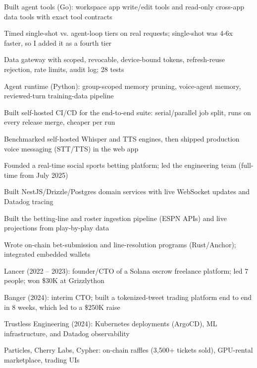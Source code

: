 \documentclass[print]{jack-resume}
\begin{document}
\begin{tightemize}
    \item Built agent tools (Go): workspace app write/edit tools and read-only cross-app data tools with exact tool contracts
    \item Timed single-shot vs. agent-loop tiers on real requests; single-shot was 4-6x faster, so I added it as a fourth tier
    \item Data gateway with scoped, revocable, device-bound tokens, refresh-reuse rejection, rate limits, audit log; 28 tests
    \item Agent runtime (Python): group-scoped memory pruning, voice-agent memory, reviewed-turn training-data pipeline
    \item Built self-hosted CI/CD for the end-to-end suite: serial/parallel job split, runs on every release merge, cheaper per run
    \item Benchmarked self-hosted Whisper and TTS engines, then shipped production voice messaging (STT/TTS) in the web app
\end{tightemize}
\sectionsep

\begin{tightemize}
    \item Founded a real-time social sports betting platform; led the engineering team (full-time from July 2025)
    \item Built NestJS/Drizzle/Postgres domain services with live WebSocket updates and Datadog tracing
    \item Built the betting-line and roster ingestion pipeline (ESPN APIs) and live projections from play-by-play data
    \item Wrote on-chain bet-submission and line-resolution programs (Rust/Anchor); integrated embedded wallets
\end{tightemize}
\sectionsep

\begin{tightemize}
    \item Lancer (2022 – 2023): founder/CTO of a Solana escrow freelance platform; led 7 people; won \$30K at Grizzlython
    \item Banger (2024): interim CTO; built a tokenized-tweet trading platform end to end in 8 weeks, which led to a \$250K raise
    \item Trustless Engineering (2024): Kubernetes deployments (ArgoCD), ML infrastructure, and Datadog observability
    \item Particles, Cherry Labs, Cypher: on-chain raffles (3,500+ tickets sold), GPU-rental marketplace, trading UIs
\end{tightemize}
\sectionsep
\end{document}
